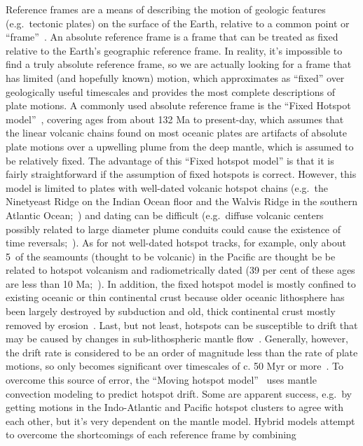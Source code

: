 Reference frames are a means of describing the motion of geologic features
(e.g.\ tectonic plates) on the surface of the Earth, relative to a common point
or ``frame''~\cite{Sh12}. An absolute reference frame is a frame that can be
treated as fixed relative to the Earth's geographic reference frame. In reality,
it's impossible to find a truly absolute reference frame, so we are actually
looking for a frame that has limited (and hopefully known) motion, which
approximates as ``fixed'' over geologically useful timescales and provides the
most complete descriptions of plate motions. A commonly used absolute reference
frame is the ``Fixed Hotspot model''~\cite{M93,M99}, covering ages from about
132 Ma to present-day, which assumes that the linear volcanic chains found on
most oceanic plates are artifacts of absolute plate motions over a upwelling
plume from the deep mantle, which is assumed to be relatively fixed. The
advantage of this ``Fixed hotspot model'' is that it is fairly straightforward
if the assumption of fixed hotspots is correct. However, this model is limited
to plates with well-dated volcanic hotspot chains (e.g.\ the Ninetyeast Ridge
on the Indian Ocean floor and the Walvis Ridge in the southern Atlantic
Ocean;~\cite{O05}) and dating can be difficult (e.g.\ diffuse volcanic centers
possibly related to large diameter plume conduits could cause the existence of
time reversals;~\cite{O05}). As for not well-dated hotspot tracks, for example,
only about 5\textperthousand\ of the seamounts (thought to be volcanic) in the
Pacific are thought be be related to hotspot volcanism and radiometrically dated
(39 per cent of these ages are less than 10 Ma;~\cite{H07}). In addition, the
fixed hotspot model is mostly confined to existing oceanic or thin continental
crust because older oceanic lithosphere has been largely destroyed by subduction
and old, thick continental crust mostly removed by erosion~\cite{C13}. Last, but
not least, hotspots can be susceptible to drift that may be caused by changes in
sub-lithospheric mantle flow~\cite{T09}. Generally, however, the drift rate is
considered to be an order of magnitude less than the rate of plate motions, so
only becomes significant over timescales of c. 50 Myr or more~\cite{O05,T07}. To
overcome this source of error, the ``Moving hotspot model''~\cite{O05} uses
mantle convection modeling to predict hotspot drift. Some are apparent success,
e.g.\ by getting motions in the Indo-Atlantic and Pacific hotspot clusters to
agree with each other, but it's very dependent on the mantle model. Hybrid
models attempt to overcome the shortcomings of each reference frame by combining
